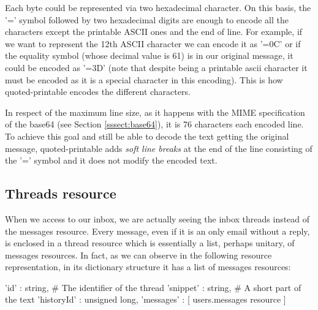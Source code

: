 Each byte could be represented via two hexadecimal character. On this basis, the '=' symbol followed by two hexadecimal digits are enough to encode all the characters except the printable ASCII ones and the end of line. For example, if we want to represent the 12th ASCII character we can encode it as '=0C' or if the equality symbol (whose decimal value is 61) is in our original message, it could be encoded as '=3D' (note that despite being a printable ascii character it must be encoded as it is a special character in this encoding). This is how quoted-printable encodes the different characters.

In respect of the maximum line size, as it happens with the MIME specification of the base64 (see Section \ref{sssect:base64}), it is 76 characters each encoded line. To achieve this goal and still be able to decode the text getting the original message, quoted-printable adds \textit{soft line breaks} at the end of the line consisting of the '=' symbol and it does not modify the encoded text.

\subsection{Threads resource}\label{ssect:threads}
When we access to our inbox, we are actually seeing the inbox threads instead of the messages resource. Every message, even if it is an only email without a reply, is enclosed in a thread resource \citep[/v1/reference/users/threads]{gmailAPI} which is essentially a list, perhaps unitary, of messages resources. In fact, as we can observe in the following resource representation, in its dictionary structure it has a list of messages resources:

\begin{python}
	{
		'id' : string, # The identifier of the thread
		'snippet' : string, # A short part of the text
		'historyId' : unsigned long,
		'messages' : [ users.messages resource ]
	}
\end{python}

